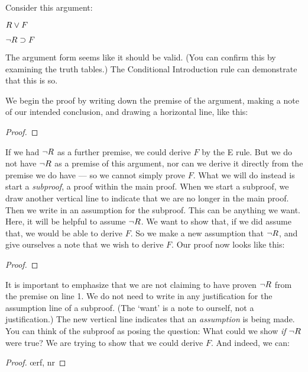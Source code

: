 Consider this argument:
\begin{earg}
\item[] $R \vee F$
\item[\therefore] $\neg R \supset F$
\end{earg}
The argument form seems like it should be valid. (You can confirm this by examining the truth tables.) The Conditional Introduction rule can demonstrate that this is so.

We begin the proof by writing down the premise of the argument, making a note of our intended conclusion, and drawing a horizontal line, like this:

\begin{proof}
	 
\end{proof}

If we had $\neg R$ as a further premise, we could derive $F$ by the {\eor}E rule. But we do not have $\neg R$ as a premise of this argument, nor can we derive it directly from the premise we do have --- so we cannot simply prove $F$. What we will do instead is start a \emph{subproof}, a proof within the main proof. When we start a subproof, we draw another vertical line to indicate that we are no longer in the main proof. Then we write in an assumption for the subproof. This can be anything we want. Here, it will be helpful to assume $\neg R$. We want to show that, if we did assume that, we would be able to derive $F$. So we make a new assumption that $\neg R$, and give ourselves a note that we wish to derive $F$. Our proof now looks like this:

\begin{proof}
	  
	\open
		 
	\close
\end{proof}

It is important to emphasize that we are not claiming to have proven $\neg R$ from the premise on line 1. We do not need to write in any justification for the assumption line of a subproof. (The `want' is a note to ourself, not a justification.) The new vertical line indicates that an \emph{assumption} is being made. You can think of the subproof as posing the question: What could we show \emph{if} $\neg R$ were true? We are trying to show that we could derive $F$. And indeed, we can:

\begin{proof}
	  
	\open
		 
		\oe{rf, nr}
	\close
\end{proof}


